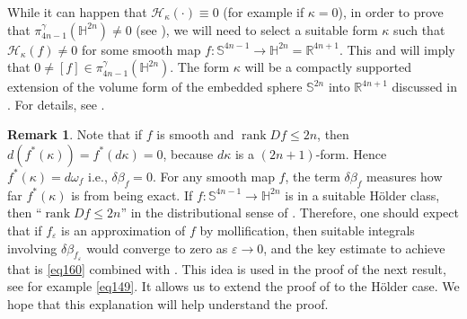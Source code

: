 \documentclass[intlimits,12pt,reqno]{amsart}
\newcommand{\Sph}{\mathbb S}
\newcommand{\bbbh}{\mathbb H}
\newcommand{\R}{\mathbb R}
\newcommand{\eps}{\varepsilon}
\numberwithin{equation}{section}
\theoremstyle{definition}
\newtheorem{remark}[theorem]{Remark}
\newcommand{\HI}{\mathcal{H}}
\def\rank{\operatorname{rank}}
\begin{document}
While it can happen that $\HI_\kappa(\cdot)\equiv 0$ (for example if $\kappa=0$), in order to prove that $\pi_{4n-1}^\gamma(\bbbh^{2n})\neq 0$ (see ), we will need to select a suitable form $\kappa$ such that $\HI_\kappa(f)\neq 0$ for some smooth map $f:\Sph^{4n-1}\to\bbbh^{2n}=\R^{4n+1}$. This and  will imply that $0\neq[f]\in\pi^\gamma_{4n-1}(\bbbh^{2n})$. The form $\kappa$ will be a compactly supported extension of the volume form of the embedded sphere $\Sph^{2n}$ into $\R^{4n+1}$ discussed in . For details, see .



\begin{remark}
\label{R3}
Note that if $f$ is smooth and $\rank Df\leq 2n$, then $d(f^*(\kappa))=f^*(d\kappa)=0$, because $d\kappa$ is a $(2n+1)$-form. Hence $f^*(\kappa)=d\omega_f$ i.e., $\delta\beta_f=0$. For any smooth map $f$, the term $\delta\beta_f$ measures how far $f^*(\kappa)$ is from being exact. If $f:\Sph^{4n-1}\to\bbbh^{2n}$ is in a suitable H\"older class, then ``$\rank Df\leq 2n$'' in the distributional sense of . Therefore, one should expect that if $f_\eps$ is an approximation of $f$ by mollification, then suitable integrals involving $\delta\beta_{f_\eps}$ would converge to zero as $\eps\to 0$, and the key estimate to achieve that is \eqref{eq160} combined with . This idea is used in the proof of the next result, see for example \eqref{eq149}. It allows us to extend the proof of \cite[Proposition~5.8]{HST14} to the H\"older case. We hope that this explanation will help understand the proof.
\end{remark}
\end{document}
